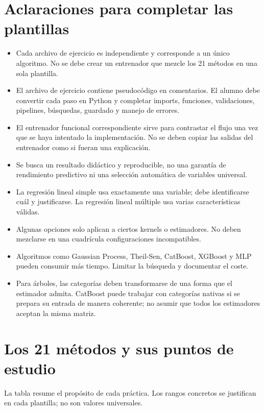 \documentclass[11pt,a4paper]{article}
\begin{document}
\section{Aclaraciones para completar las plantillas}
\begin{itemize}
\item Cada archivo de ejercicio es independiente y corresponde a un único algoritmo. No se debe crear un entrenador que mezcle los 21 métodos en una sola plantilla.
\item El archivo de ejercicio contiene pseudocódigo en comentarios. El alumno debe convertir cada paso en Python y completar imports, funciones, validaciones, pipelines, búsquedas, guardado y manejo de errores.
\item El entrenador funcional correspondiente sirve para contrastar el flujo una vez que se haya intentado la implementación. No se deben copiar las salidas del entrenador como si fueran una explicación.
\item Se busca un resultado didáctico y reproducible, no una garantía de rendimiento predictivo ni una selección automática de variables universal.
\item La regresión lineal simple usa exactamente una variable; debe identificarse cuál y justificarse. La regresión lineal múltiple usa varias características válidas.
\item Algunas opciones solo aplican a ciertos kernels o estimadores. No deben mezclarse en una cuadrícula configuraciones incompatibles.
\item Algoritmos como Gaussian Process, Theil-Sen, CatBoost, XGBoost y MLP pueden consumir más tiempo. Limitar la búsqueda y documentar el coste.
\item Para árboles, las categorías deben transformarse de una forma que el estimador admita. CatBoost puede trabajar con categorías nativas si se prepara su entrada de manera coherente; no asumir que todos los estimadores aceptan la misma matriz.
\end{itemize}

\section{Los 21 métodos y sus puntos de estudio}
La tabla resume el propósito de cada práctica. Los rangos concretos se justifican en cada plantilla; no son valores universales.
\end{document}
